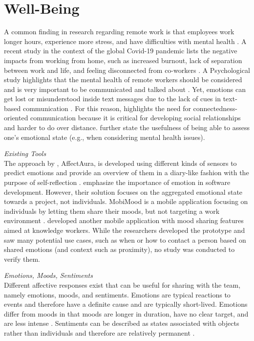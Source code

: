 \section{Well-Being}
\label{section:wellbeing}
A common finding in research regarding remote work is that employees work longer hours, experience more stress, and have difficulties with mental health \autocite{mswellbeing, mulki2009set, qualtricksmental}. A recent study in the context of the global Covid-19 pandemic lists the negative impacts from working from home, such as increased burnout, lack of separation between work and life, and feeling disconnected from co-workers \autocite{mswellbeing}. A Psychological study highlights that the mental health of remote workers should be considered and is very important to be communicated and talked about \autocite{grant2013exploration}. Yet, emotions can get lost or misunderstood inside text messages due to the lack of cues in text-based communication \autocite{hook2008interactional}. For this reason, \textcite{kuwabara2002connectedness} highlights the need for connectedness-oriented communication because it is critical for developing social relationships and harder to do over distance. \textcite{mcduff2012affectaura} further state the usefulness of being able to assess one’s emotional state (e.g., when considering mental health issues).

\medskip\noindent\textit{Existing Tools}\\
The approach by \citeauthor{mcduff2012affectaura}, AffectAura, is developed using different kinds of sensors to predict emotions and provide an overview of them in a diary-like fashion with the purpose of self-reflection \autocite{dullemond2013fixing}. \textcite{guzman2013towards} emphasize the importance of emotion in software development. However, their solution focuses on the aggregated emotional state towards a project, not individuals. MobiMood is a mobile application focusing on individuals by letting them share their moods, but not targeting a work environment \autocite{church2010study}. \textcite{saari2008mobile} developed another mobile application with mood sharing features aimed at knowledge workers. While the researchers developed the prototype and saw many potential use cases, such as when or how to contact a person based on shared emotions (and context such as proximity), no study was conducted to verify them.

\medskip\noindent\textit{Emotions, Moods, Sentiments}\\
Different affective responses exist that can be useful for sharing with the team, namely emotions, moods, and sentiments. Emotions are typical reactions to events and therefore have a definite cause and are typically short-lived. Emotions differ from moods in that moods are longer in duration, have no clear target, and are less intense \autocite{frijda1994varieties, brave2007emotion}. Sentiments can be described as states associated with objects rather than individuals and therefore are relatively permanent \autocite{brave2007emotion}.

